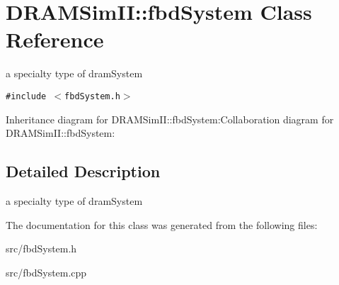 \section{DRAMSimII::fbdSystem Class Reference}
\label{class_d_r_a_m_sim_i_i_1_1fbd_system}
a specialty type of dramSystem  


{\tt \#include $<$fbdSystem.h$>$}

Inheritance diagram for DRAMSimII::fbdSystem:Collaboration diagram for DRAMSimII::fbdSystem:

\subsection{Detailed Description}
a specialty type of dramSystem 

The documentation for this class was generated from the following files:\begin{CompactItemize}
\item 
src/fbdSystem.h\item 
src/fbdSystem.cpp\end{CompactItemize}
